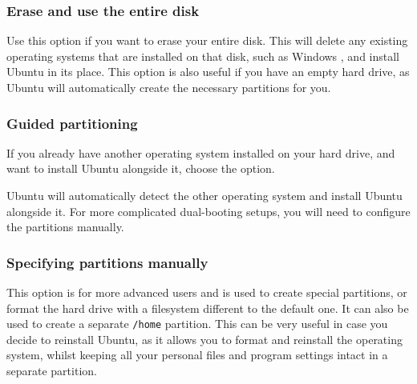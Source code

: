 \subsubsection{Erase and use the entire disk}
Use this option if you want to erase your entire disk. This will delete any existing operating systems that are installed on that disk, such as Windows , and install Ubuntu in its place. This option is also useful if you have an empty hard drive, as Ubuntu will automatically create the necessary partitions for you.

\subsubsection{Guided partitioning}
If you already have another operating system installed on your hard drive, and want to install Ubuntu alongside it, choose the  option.

Ubuntu will automatically detect the other operating system and install Ubuntu alongside it. For more complicated \gls{dual-booting} setups, you will need to configure the partitions manually.

\subsubsection{Specifying partitions manually}
This option is for more advanced users and is used to create special partitions, or format the hard drive with a filesystem different to the default one. It can also be used to create a separate \texttt{/home} partition. This can be very useful in case you decide to reinstall Ubuntu, as it allows you to format and reinstall the operating system, whilst keeping all your personal files and program settings intact in a separate partition. 

